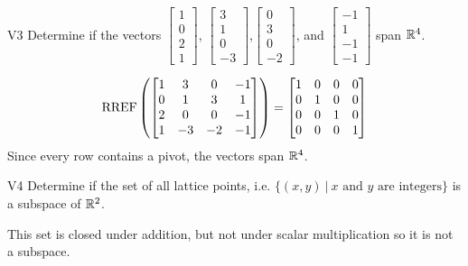 \documentclass{sbgLAexam}
\begin{document}
\begin{extract}\newpage\end{extract}
\begin{problem}{V3}
Determine if the vectors $\begin{bmatrix} 1 \\ 0 \\ 2 \\1 \end{bmatrix}$, $\begin{bmatrix} 3 \\ 1 \\ 0 \\ -3 \end{bmatrix}$,$\begin{bmatrix} 0 \\ 3 \\ 0 \\ -2 \end{bmatrix}$, and $\begin{bmatrix}-1 \\ 1 \\ -1 \\ -1 \end{bmatrix}$ span $\mathbb{R}^4$.
\end{problem}
\begin{solution}
$$\operatorname{RREF}\left(\begin{bmatrix}1 & 3 & 0 & -1 \\ 0 & 1 & 3 & 1 \\ 2 & 0 & 0 & -1 \\ 1 & -3 & -2 & -1 \end{bmatrix} \right) =\begin{bmatrix} 1 & 0 & 0 & 0 \\ 0 & 1 & 0 & 0 \\ 0 & 0 & 1 & 0 \\ 0 & 0 & 0 & 1 \end{bmatrix}$$
Since every row contains a pivot, the vectors span $\mathbb{R}^4$.
\end{solution}

\begin{problem}{V4}
Determine if the set of all lattice points, i.e. $\{(x,y)\ \big|\ \text{$x$ and $y$ are integers} \}$ is a subspace of $\mathbb{R}^2$.
\end{problem}
\begin{solution}
This set is closed under addition, but not under scalar multiplication so it is not a subspace.
\end{solution}
\end{document}
